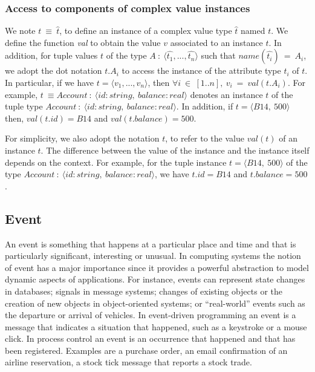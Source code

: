 \subsubsection{Access to components of complex value instances}
We note $t\ \equiv\ \hat{t}$, to define an instance of a complex value type $\hat{t}$ named $t$. 
We define the function \textit{val} to obtain the value $v$ associated to an instance $t$. In addition, for tuple values $t$ of the type $A\ :\ \langle  \hat{t_1}, ..., \hat{t_n}\rangle$ such that $name(\hat{t_i})\ =\ A_i$, we adopt the dot notation $t.A_i$ to access the instance of the attribute type $\hat{t_i}$ of $t$. In particular, if we have $t = \langle v_1, ..., v_n\rangle$, then $\forall i \ \in \ [1..n],\ v_i\ =\ val(t.A_i)$.  
For example, $t\ \equiv Account\ :\ \langle id: string,\ balance: real\rangle$ denotes an instance $t$ of the tuple type $Account\ :\ \langle id: string,\ balance: real\rangle$. In addition, if $t = \langle B14,\ 500\rangle$ then, $val(t.id) = B14$ and $val(t.balance) = 500$.

For simplicity, we also adopt the notation $t$, to refer to the value $val(t)$ of an instance $t$. The difference between the value of the instance and the instance itself depends on the context.
For example, for the tuple instance $t= \langle B14,\ 500\rangle$ of the type $Account\ :\ \langle id: string,\ balance: real\rangle$, we have $t.id = B14$ and $t.balance = 500$.
 \subsection{Event}
 An event is something that happens at a particular place and time and that is particularly significant, interesting or unusual. In computing systems the notion of event has a major importance since it provides a powerful abstraction to model dynamic aspects of applications. For instance, events can represent state changes in databases; signals in message systems; changes of existing objects or the creation of new objects in object-oriented systems; or “real-world” events such as the departure or arrival of vehicles. In event-driven programming an event is a message that indicates a situation that happened, such as a keystroke or a mouse click. In process control an event is an occurrence that happened and that has been registered.  Examples are a purchase order, an email confirmation of an airline reservation, a stock tick message that reports a stock trade.
 
